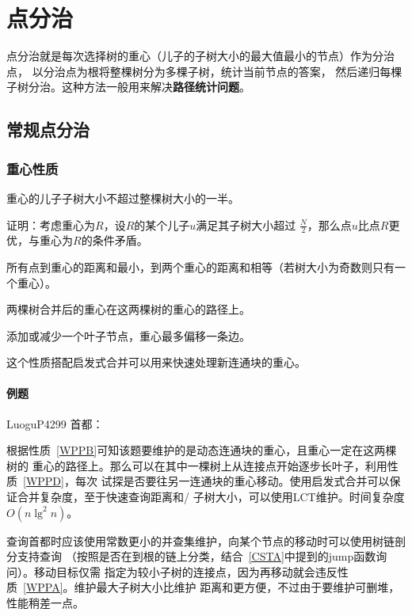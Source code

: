 \section{点分治}
点分治就是每次选择树的重心（儿子的子树大小的最大值最小的节点）作为分治点，
以分治点为根将整棵树分为多棵子树，统计当前节点的答案，
然后递归每棵子树分治。这种方法一般用来解决{\bfseries 路径统计问题}。
\subsection{常规点分治}
\subsubsection{重心性质}
\begin{property}\label{WPPA}
    重心的儿子子树大小不超过整棵树大小的一半。
\end{property}
证明：考虑重心为$R$，设$R$的某个儿子$u$满足其子树大小超过
$\frac{N}{2}$，那么点$u$比点$R$更优，与重心为$R$的条件矛盾。
\begin{property}\label{WPPB}
    所有点到重心的距离和最小，到两个重心的距离和相等（若树大小为奇数则只有一个重心）。
\end{property}
\begin{property}\label{WPPC}
    两棵树合并后的重心在这两棵树的重心的路径上。
\end{property}
\begin{property}\label{WPPD}
    添加或减少一个叶子节点，重心最多偏移一条边。
\end{property}

这个性质搭配启发式合并可以用来快速处理新连通块的重心。

\paragraph{例题} LuoguP4299 首都：

根据性质~\ref{WPPB}可知该题要维护的是动态连通块的重心，且重心一定在这两棵树的
重心的路径上。那么可以在其中一棵树上从连接点开始逐步长叶子，利用性质~\ref{WPPD}，每次
试探是否要往另一连通块的重心移动。使用启发式合并可以保证合并复杂度，至于快速查询距离和/
子树大小，可以使用LCT维护。时间复杂度$O(n\lg^2n)$。

查询首都时应该使用常数更小的并查集维护，向某个节点的移动时可以使用树链剖分支持查询
（按照是否在到根的链上分类，结合~\ref{CSTA}中提到的jump函数询问）。移动目标仅需
指定为较小子树的连接点，因为再移动就会违反性质~\ref{WPPA}。维护最大子树大小比维护
距离和更方便，不过由于要维护可删堆，性能稍差一点。

